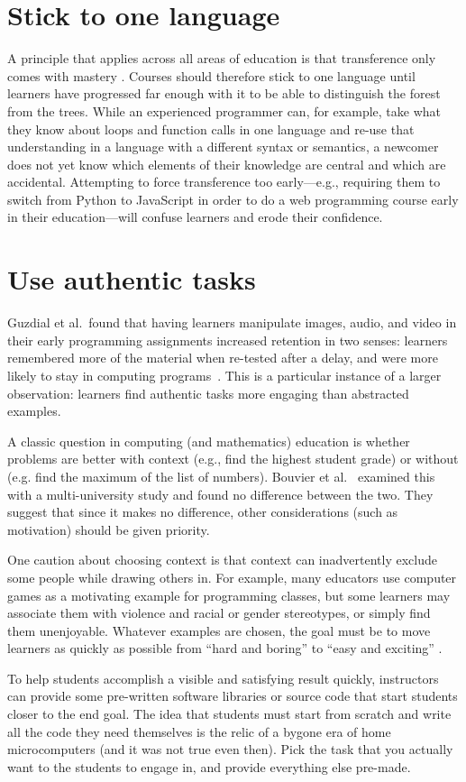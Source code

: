 \documentclass[10pt,letterpaper]{article}
\newcommand{\rulemajor}[2]{\section{#1}\label{#2}}
\newcommand{\evidence}[1]{}
\begin{document}
\rulemajor{Stick to one language}{one-language}
\evidence{Low}

A principle that applies across all areas of education is that
transference only comes with mastery \cite{gick-holyoak}.
Courses should therefore stick to one language until learners have progressed far enough with it
to be able to distinguish the forest from the trees.
While an experienced programmer can,
for example,
take what they know about loops and function calls in one language
and re-use that understanding in a language with a different syntax or semantics,
a newcomer does not yet know which elements of their knowledge are central
and which are accidental.
Attempting to force transference too early---e.g.,
requiring them to switch from Python to JavaScript in order to do a web programming course
early in their education---will confuse learners and erode their confidence.

\rulemajor{Use authentic tasks}{authentic-tasks}
\evidence{Medium}

Guzdial et al.\ found that having learners manipulate images, audio, and video
in their early programming assignments
increased retention in two senses:
learners remembered more of the material when re-tested after a delay,
and were more likely to stay in computing programs~\cite{guzdial-media}.
This is a particular instance of a larger observation:
learners find authentic tasks more engaging than abstracted examples.

A classic question in computing (and mathematics) education
is whether problems are better with context (e.g., find the highest student grade)
or without (e.g. find the maximum of the list of numbers).
Bouvier et al.~\cite{bouvier-context} examined this with a multi-university study
and found no difference between the two.
They suggest that since it makes no difference,
other considerations (such as motivation) should be given priority.

One caution about choosing context is that context can inadvertently exclude some people while drawing others in.
For example,
many educators use computer games as a motivating example for programming classes,
but some learners may associate them with violence and racial or gender stereotypes,
or simply find them unenjoyable.
Whatever examples are chosen,
the goal must be to move learners as quickly as possible
from ``hard and boring'' to ``easy and exciting'' \cite{repenning}.

To help students accomplish a visible and satisfying result
quickly, instructors can provide some pre-written software libraries or source code that start students
closer to the end goal.  The idea that students must start from scratch and write all the code they need
themselves is the relic of a bygone era of home microcomputers (and it was not true even then).
Pick the task that you actually want to the students to engage in, and provide everything else pre-made.
\end{document}
